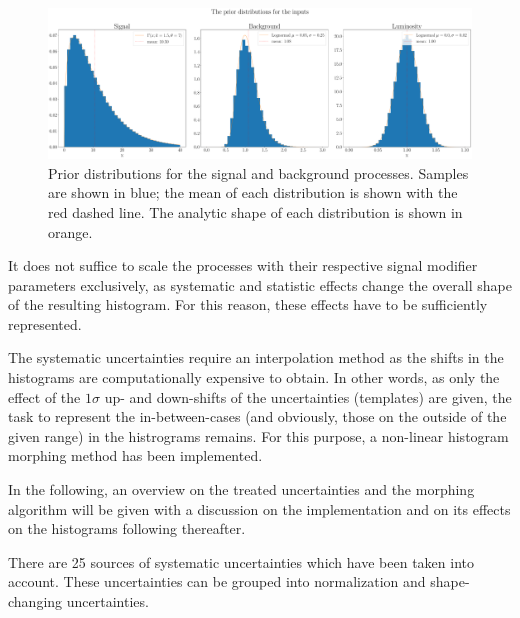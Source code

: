 \begin{figure}[h!]
	\centering
	\includegraphics[width=\linewidth]{figures/network_setup/priors.pdf}
	\caption{Prior distributions for the signal and background processes. Samples are shown in blue; the mean of each distribution is shown with the red dashed line. The analytic shape of each distribution is shown in orange.}
	\label{fig:priors}
\end{figure}

It does not suffice to scale the processes with their respective signal modifier parameters exclusively, as systematic and statistic effects change the overall shape of the resulting histogram. For this reason, these effects have to be sufficiently represented.


The systematic uncertainties require an interpolation method as the shifts in the histograms are computationally expensive to obtain. In other words, as only the effect of the $1\sigma$ up- and down-shifts of the uncertainties (templates) are given, the task to represent the in-between-cases (and obviously, those on the outside of the given range) in the histrograms remains. For this purpose, a non-linear histogram morphing method has been implemented.

In the following, an overview on the treated uncertainties and the morphing algorithm will be given with a discussion on the implementation and on its effects on the histograms following thereafter.


There are 25 sources of systematic uncertainties which have been taken into account. These uncertainties can be grouped into normalization and shape-changing uncertainties.

